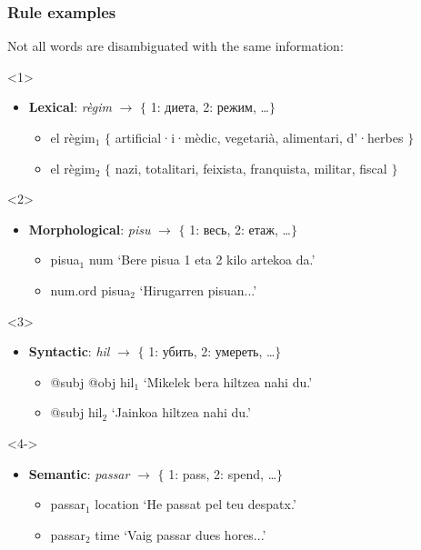 \documentclass[10pt,xetex]{beamer} %
\begin{document}
\begin{frame}

\frametitle{Rule examples}

Not all words are disambiguated with the same information:

\begin{onlyenv}<1>
	\begin{itemize}
	  \item {\bf Lexical}: {\em règim} $\rightarrow$ $\{$ 1: диета, 2: режим, \ldots $\}$
	  \begin{itemize}
	    \item el règim$_1$ $\{$ artificial·i·mèdic, vegetarià, alimentari, d'·herbes $\}$
	    \item el règim$_2$ $\{$ nazi, totalitari, feixista, franquista, militar, fiscal $\}$
	  \end{itemize}
   \end{itemize}
\end{onlyenv}


\begin{onlyenv}<2>
	\begin{itemize}
	  \item {\bf Morphological}: {\em pisu} $\rightarrow$ $\{$ 1: весь, 2: етаж, \ldots $\}$
	  \begin{itemize}
	    \item pisua$_1$ {\sc num} `Bere pisua 1 eta 2 kilo artekoa da.'
	    \item {\sc num.ord} pisua$_2$ `Hirugarren pisuan...'
	  \end{itemize}
	\end{itemize}
\end{onlyenv}

\begin{onlyenv}<3>
	\begin{itemize}
	  \item {\bf Syntactic}: {\em hil} $\rightarrow$ $\{$ 1: убить, 2: умереть, \ldots $\}$
	  \begin{itemize}
	    \item {\sc @subj} {\sc @obj} hil$_1$ `Mikelek bera hiltzea nahi du.' %
	    \item {\sc @subj} hil$_2$ `Jainkoa hiltzea nahi du.' %
	  \end{itemize}
   \end{itemize}
\end{onlyenv}

\begin{onlyenv}<4->
	\begin{itemize}
	  \item {\bf Semantic}: {\em passar} $\rightarrow$ $\{$ 1: pass, 2: spend, \ldots $\}$
	  \begin{itemize}
	    \item passar$_1$ {\sc location} `He passat pel teu despatx.'
	    \item passar$_2$ {\sc time} `Vaig passar dues hores...'
	  \end{itemize}
	\end{itemize}
\end{onlyenv}


\end{frame}
\end{document}
